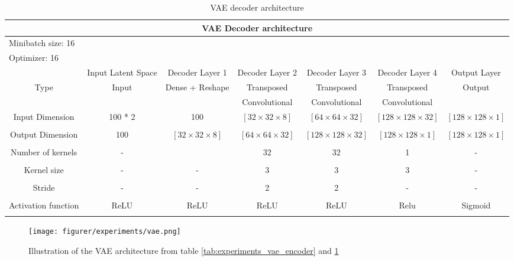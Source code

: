 \documentclass[11pt]{article}
\begin{document}
  \begin{table}[h!]
  \centering
  \begin{adjustbox}{max width=\textwidth}
  \begin{tabular}{*{7}{c}}%
  \hline
  \multicolumn{7}{c}{VAE Decoder architecture}
  \\
  \hline
  \multicolumn{7}{l}{Minibatch size: 16} \\
  \multicolumn{7}{l}{Optimizer: 16} \\
  \hline
   & Input Latent Space & Decoder Layer 1 & Decoder Layer 2 & Decoder Layer 3 & Decoder Layer 4 & Output Layer \\
  \hline
  \hline
  Type & Input & Dense + Reshape & Transposed & Transposed & Transposed & Output \\
  & & & Convolutional & Convolutional & Convolutional & \\
  \hline
  Input Dimension & 100 * 2 & 100 &  $[32 \times 32 \times 8]$ & $[64 \times 64 \times 32]$ & $[128 \times 128 \times 32]$ & $[128 \times 128 \times 1]$ \\ \\
  \hline
  Output Dimension & 100 & $[32 \times 32 \times 8]$ & $[64 \times 64 \times 32]$ & $[128 \times 128 \times 32]$ & $[128 \times 128 \times 1]$ & $[128 \times 128 \times 1]$ \\ \\
  \hline
  Number of kernels & - & & 32 & 32 & 1 & - & \\ \\
  \hline
  Kernel size & - & - & 3 & 3 & 3 & - & \\ \\
  \hline
  Stride & - & -  & 2 & 2 & - & - & \\ \\
  \hline
  Activation function & ReLU & ReLU & ReLU & ReLU & Relu & Sigmoid & \\ \\
  \hline
\end{tabular}
\end{adjustbox}
  \caption{VAE decoder architecture}
  \label{tab:experimetns_vae_decoder}
\end{table}



\begin{figure}[!h]
    \centering
    \texttt{[image: figurer/experiments/vae.png]}
    \caption{Illustration of the VAE architecture from table \ref{tab:experiments_vae_encoder} and \ref{tab:experimetns_vae_decoder}}
    \label{fig:experiment_vae}
\end{figure}
\end{document}
